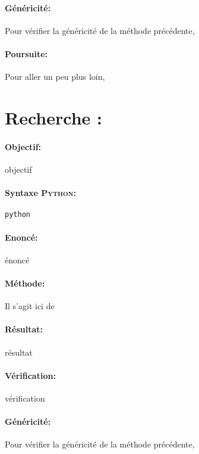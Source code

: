 \documentclass[11pt,a4paper,colorlinks,breaklinks]{article}
\def\python{\textsc{Python}}
\begin{document}
\paragraph{Généricité:} Pour vérifier la généricité de la méthode précédente,

\paragraph{Poursuite:} Pour aller un peu plus loin,


\newpage
\section{Recherche : }\label{maths:recherche}
\paragraph{Objectif:} objectif

\paragraph{Syntaxe \python:} \texttt{python}

\begin{framed}
\paragraph{Enoncé:} énoncé
\end{framed}

\paragraph{Méthode:} Il s'agit ici de 

\paragraph{Résultat:} résultat

\paragraph{Vérification:} vérification

\paragraph{Généricité:} Pour vérifier la généricité de la méthode précédente,
\end{document}
